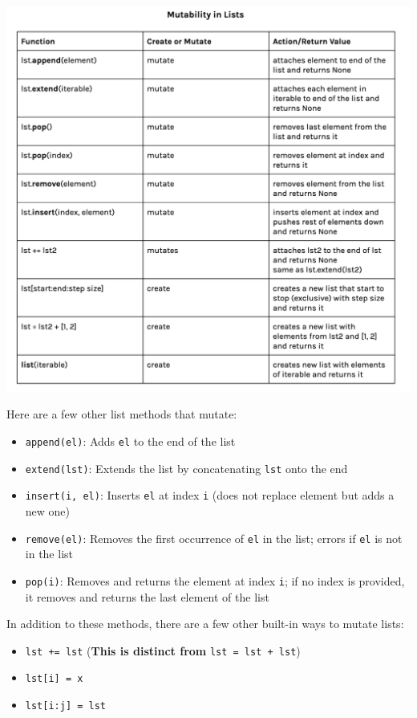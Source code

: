 \includegraphics[width=.9\textwidth]{list-mutation.png}


Here are a few other list methods that mutate:
\begin{itemize}
\item \lstinline{append(el)}: Adds \lstinline{el} to the end of the list
\item \lstinline{extend(lst)}: Extends the list by concatenating \lstinline{lst} onto the end
\item \lstinline{insert(i, el)}: Inserts \lstinline{el} at index \lstinline{i} (does not replace element but adds a new one)
\item \lstinline{remove(el)}: Removes the first occurrence of \lstinline{el} in the list; errors if \lstinline{el} is not in the list 
\item \lstinline{pop(i)}: Removes and returns the element at index \lstinline{i}; if no index is provided, it removes and returns the last element of the list
\end{itemize}

In addition to these methods, there are a few other built-in ways to mutate lists: 

\begin{itemize}
\item \lstinline$lst += lst$ (\textbf{This is distinct from} \lstinline$lst = lst + lst$)
\item \lstinline$lst[i] = x$
\item \lstinline$lst[i:j] = lst$
\end{itemize}

